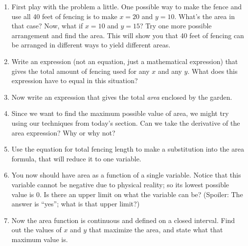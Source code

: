 \documentclass[11pt]{article}
\begin{document}
\begin{enumerate}
    \item First play with the problem a little. One possible way to make the fence and use all 40 feet of fencing is to make $x = 20$ and $y = 10$. What's the area in that case? Now, what if $x = 10$ and $y = 15$? Try one more possible arrangement and find the area. This will show you that 40 feet of fencing can be arranged in different ways to yield different areas. 
    \item Write an expression (not an equation, just a mathematical expression) that gives the total amount of fencing used for any $x$ and any $y$. What does this expression have to equal in this situation?
    \item Now write an expression that gives the total \emph{area} enclosed by the garden. 
    \item Since we want to find the maximum possible value of area, we might try using our techniques from today's section. Can we take the derivative of the area expression? Why or why not? 
    \item Use the equation for total fencing length to make a substitution into the area formula, that will reduce it to one variable. 
    \item You now should have area as a function of a single variable. Notice that this variable cannot be negative due to physical reality; so its lowest possible value is 0. Is there an upper limit on what the variable can be? (Spoiler: The answer is ``yes''; what is that upper limit?)
    \item Now the area function is  continuous and defined on a closed interval. Find out the values of $x$ and $y$ that maximize the area, and state what that maximum value is. 
\end{enumerate}
\end{document}
